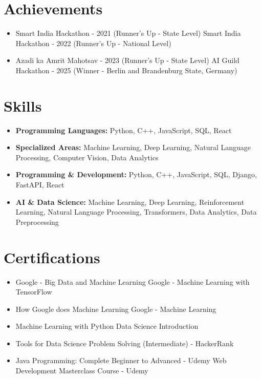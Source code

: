\documentclass[a4paper,10pt]{article}
\begin{document}
\section*{Achievements}
\begin{itemize}
\item Smart India Hackathon - 2021 (Runner's Up - State Level) \hfill Smart India Hackathon - 2022 (Runner's Up - National Level)
\item Azadi ka Amrit Mahotsav - 2023 (Runner's Up - State Level) \hfill AI Guild Hackathon - 2025 (Winner - Berlin and Brandenburg State, Germany)
\end{itemize}

\section*{Skills}
\begin{itemize}
  \item \textbf{Programming Languages:} Python, C++, JavaScript, SQL, React
  \item \textbf{Specialized Areas:} Machine Learning, Deep Learning, Natural Language Processing, Computer Vision, Data Analytics
  \item \textbf{Programming \& Development:} Python, C++, JavaScript, SQL, Django, FastAPI, React
  \item \textbf{AI \& Data Science:} Machine Learning, Deep Learning, Reinforcement Learning, Natural Language Processing, Transformers, Data Analytics, Data Preprocessing
\end{itemize}

\section*{Certifications}
\begin{itemize}
\item Google - Big Data and Machine Learning \hfill Google - Machine Learning with TensorFlow
\item How Google does Machine Learning \hfill Google - Machine Learning
\item Machine Learning with Python \hfill Data Science Introduction
\item Tools for Data Science \hfill Problem Solving (Intermediate) - HackerRank
\item Java Programming: Complete Beginner to Advanced - Udemy \hfill Web Development Masterclass Course - Udemy
\end{itemize}
\end{document}
